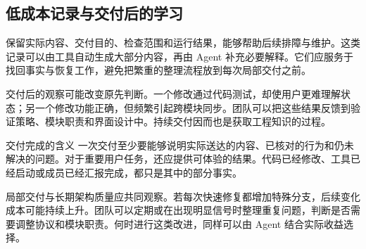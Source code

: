 \subsection{低成本记录与交付后的学习}
保留实际内容、交付目的、检查范围和运行结果，能够帮助后续排障与维护。这类记录可以由工具自动生成大部分内容，再由 Agent 补充必要解释。它们应服务于找回事实与恢复工作，避免把繁重的整理流程放到每次局部交付之前。

交付后的观察可能改变原先判断。一个修改通过代码测试，却使用户更难理解状态；另一个修改功能正确，但频繁引起跨模块同步。团队可以把这些结果反馈到验证策略、模块职责和界面设计中。持续交付因而也是获取工程知识的过程。

\begin{insight}{交付完成的含义}
一次交付至少要能够说明实际送达的内容、已核对的行为和仍未解决的问题。对于重要用户任务，还应提供可体验的结果。代码已经修改、工具已经启动或成员已经汇报完成，都只是其中的部分事实。
\end{insight}

局部交付与长期架构质量应共同观察。若每次快速修复都增加特殊分支，后续变化成本可能持续上升。团队可以定期或在出现明显信号时整理重复问题，判断是否需要调整协议和模块职责。何时进行这类改进，同样可以由 Agent 结合实际收益选择。
